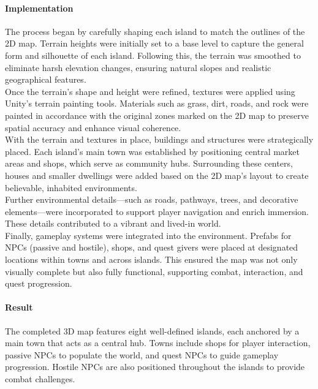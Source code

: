 \documentclass{article}
\begin{document}
\paragraph{Implementation}\hfill

The process began by carefully shaping each island to match the outlines of the 2D map. Terrain heights were initially set to a base level to capture the general form and silhouette of each island. Following this, the terrain was smoothed to eliminate harsh elevation changes, ensuring natural slopes and realistic geographical features.\\

Once the terrain's shape and height were refined, textures were applied using Unity's terrain painting tools. Materials such as grass, dirt, roads, and rock were painted in accordance with the original zones marked on the 2D map to preserve spatial accuracy and enhance visual coherence.\\

With the terrain and textures in place, buildings and structures were strategically placed. Each island's main town was established by positioning central market areas and shops, which serve as community hubs. Surrounding these centers, houses and smaller dwellings were added based on the 2D map's layout to create believable, inhabited environments.\\

Further environmental details—such as roads, pathways, trees, and decorative elements—were incorporated to support player navigation and enrich immersion. These details contributed to a vibrant and lived-in world.\\

Finally, gameplay systems were integrated into the environment. Prefabs for NPCs (passive and hostile), shops, and quest givers were placed at designated locations within towns and across islands. This ensured the map was not only visually complete but also fully functional, supporting combat, interaction, and quest progression.

\paragraph{Result}\hfill

The completed 3D map features eight well-defined islands, each anchored by a main town that acts as a central hub. Towns include shops for player interaction, passive NPCs to populate the world, and quest NPCs to guide gameplay progression. Hostile NPCs are also positioned throughout the islands to provide combat challenges.\\
\end{document}

